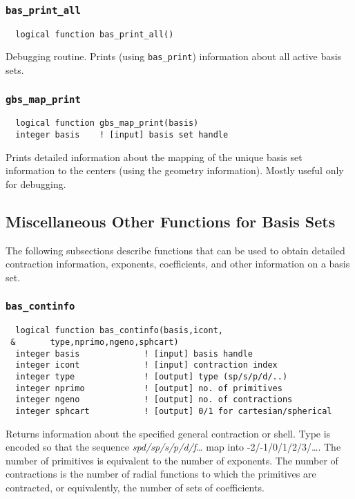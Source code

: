 \subsubsection{{\tt bas\_print\_all}}
\begin{verbatim}
  logical function bas_print_all()
\end{verbatim}
Debugging routine.  Prints (using \verb+bas_print+) information about
all active basis sets.

\subsubsection{{\tt gbs\_map\_print}}
\begin{verbatim}
  logical function gbs_map_print(basis)
  integer basis    ! [input] basis set handle
\end{verbatim}
Prints detailed information about the mapping of the unique basis set
information to the centers (using the geometry information).  Mostly
useful only for debugging.


\subsection{Miscellaneous Other Functions for Basis Sets}

The following subsections describe functions that can be used to
obtain detailed contraction information, exponents, coefficients,
and other information on a basis set.

\subsubsection{{\tt bas\_continfo}}
\begin{verbatim}
  logical function bas_continfo(basis,icont,
 &       type,nprimo,ngeno,sphcart)
  integer basis             ! [input] basis handle
  integer icont             ! [input] contraction index
  integer type              ! [output] type (sp/s/p/d/..)
  integer nprimo            ! [output] no. of primitives
  integer ngeno             ! [output] no. of contractions
  integer sphcart           ! [output] 0/1 for cartesian/spherical
\end{verbatim}
Returns information about the specified general contraction or shell.
Type is encoded so that the sequence {\em spd/sp/s/p/d/f\ldots} map
into -2/-1/0/1/2/3/\ldots.  The number of primitives is equivalent to
the number of exponents.  The number of contractions is the number of
radial functions to which the primitives are contracted, or equivalently,
the number of sets of coefficients.

